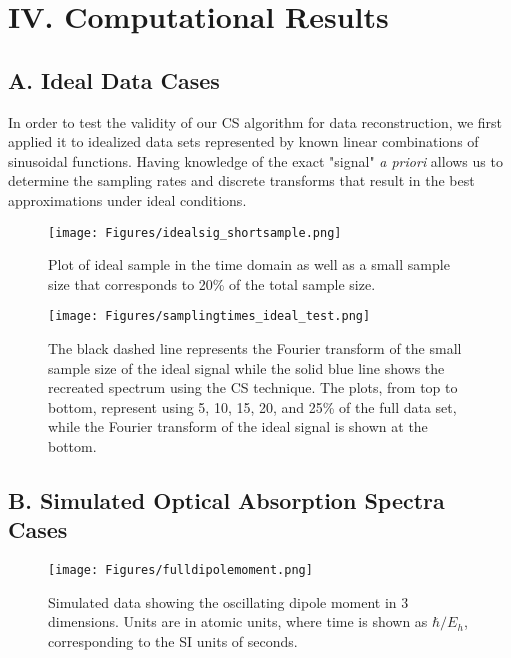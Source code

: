 \documentclass[11pt]{article}
\begin{document}

\section*{IV.	Computational Results} %


\subsection*{A.	Ideal Data Cases}
In order to test the validity of our CS algorithm for data reconstruction, we first applied it to idealized data sets represented by known linear combinations of sinusoidal functions. Having knowledge of the exact "signal" \emph{a priori} allows us to determine the sampling rates and discrete transforms that result in the best approximations under ideal conditions. 

\begin{figure}[H]
\texttt{[image: Figures/idealsig\_shortsample.png]}
\caption{Plot of ideal sample in the time domain as well as a small sample size that corresponds to 20\% of the total sample size.}
\label{fig:idealsig}
\end{figure}

\begin{figure}[H]
\texttt{[image: Figures/samplingtimes\_ideal\_test.png]}
\caption{The black dashed line represents the Fourier transform of the small sample size of the ideal signal while the solid blue line shows the recreated spectrum using the CS technique. The plots, from top to bottom, represent using 5, 10, 15, 20, and 25\% of the full data set, while the Fourier transform of the ideal signal is shown at the bottom.}
\label{fig:idealsamplerates}
\end{figure}
\pagebreak


\subsection*{B.	Simulated Optical Absorption Spectra Cases}

\begin{figure}[H]
\texttt{[image: Figures/fulldipolemoment.png]}
\caption{Simulated data showing the oscillating dipole moment in 3 dimensions. Units are in atomic units, where time is shown as $\hbar / E_h$, corresponding to the SI units of seconds.}
\label{fig:fulldipole}
\end{figure}
\end{document}
